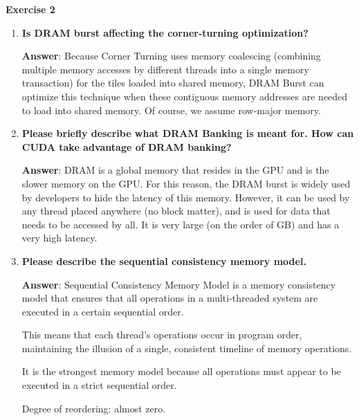 \begin{flushleft}
    \textcolor{Green3}{ \textbf{Exercise 2}}
\end{flushleft}
\begin{enumerate}[label=\Alph*.]
    \item \textcolor{Green3}{\textbf{%
        Is DRAM burst affecting the corner-turning optimization?
    }}

    \textbf{Answer}: Because Corner Turning uses memory coalescing (combining multiple memory accesses by different threads into a single memory transaction) for the tiles loaded into shared memory, DRAM Burst can optimize this technique when these contiguous memory addresses are needed to load into shared memory. Of course, we assume row-major memory.

    \item \textcolor{Green3}{\textbf{%
        Please briefly describe what DRAM Banking is meant for. How can CUDA take advantage of DRAM banking?
    }}

    \textbf{Answer}: DRAM is a global memory that resides in the GPU and is the slower memory on the GPU. For this reason, the DRAM burst is widely used by developers to hide the latency of this memory. However, it can be used by any thread placed anywhere (no block matter), and is used for data that needs to be accessed by all. It is very large (on the order of GB) and has a very high latency.

    \item \textcolor{Green3}{\textbf{%
        Please describe the sequential consistency memory model.
    }}

    \textbf{Answer}: Sequential Consistency Memory Model is a memory consistency model that ensures that all operations in a multi-threaded system are executed in a certain sequential order.

    This means that each thread's operations occur in program order, maintaining the illusion of a single, consistent timeline of memory operations.
    
    It is the strongest memory model because all operations must appear to be executed in a strict sequential order.
    
    Degree of reordering: almost zero.
\end{enumerate}

\newpage


